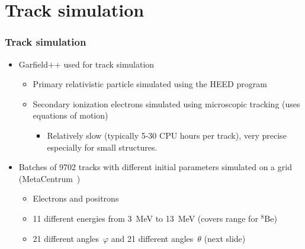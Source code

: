 \documentclass{beamer}
\begin{document}
	\section{Track simulation}
	\begin{frame}
		\frametitle{Track simulation}
		\begin{itemize}
			\item Garfield++ used for track simulation
			\begin{itemize}
				\item Primary relativistic particle simulated using the HEED program~\cite{heed}
				\item Secondary ionization electrons simulated using microscopic tracking (uses equations of motion)
				\begin{itemize}\item Relatively slow (typically 5-30 CPU hours per track), very precise especially for small structures.  \end{itemize}
			\end{itemize}
			\item Batches of 9702 tracks with different initial parameters simulated on a grid (MetaCentrum~\cite{meta})
			\begin{itemize}
				\item Electrons and positrons
				\item 11 different energies from 3~MeV to 13~MeV (covers range for $ {}^8\text{Be} $)
				\item 21 different angles~$\varphi$ and 21 different angles~$\theta$ (next slide)
			\end{itemize}
		\end{itemize}
	\end{frame}
	
\end{document}
